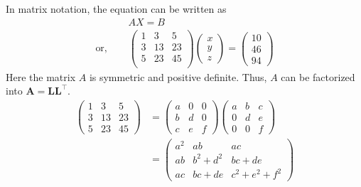 \documentclass[12pt,class=book,crop=false]{standalone}
\begin{document}
\begin{soln}
    In matrix notation, the equation can be written as
    \begin{align*}
                         & AX=B \\
        \text{or, }\quad &
        \begin{pmatrix}
            1 & 3  & 5  \\
            3 & 13 & 23 \\
            5 & 23 & 45 \\
        \end{pmatrix}
        \begin{pmatrix}
            x \\
            y \\
            z
        \end{pmatrix}=
        \begin{pmatrix}
            10 \\
            46 \\
            94
        \end{pmatrix}
    \end{align*}
    Here the matrix $ A $ is symmetric and positive definite. Thus, $ A $ can be factorized into $ \mathbf{A}=\mathbf{L}\mathbf{L}^\top$.
    \begin{align*}
        \begin{pmatrix}
            1 & 3  & 5  \\
            3 & 13 & 23 \\
            5 & 23 & 45
        \end{pmatrix} & =
        \begin{pmatrix}
            a & 0 & 0 \\
            b & d & 0 \\
            c & e & f
        \end{pmatrix}
        \begin{pmatrix}
            a & b & c \\
            0 & d & e \\
            0 & 0 & f
        \end{pmatrix}                                 \\
                                    & = \begin{pmatrix}
            a^2 & ab      & ac          \\
            ab  & b^2+d^2 & bc+de       \\
            ac  & bc+de   & c^2+e^2+f^2
        \end{pmatrix}

\end{align*}
\end{soln}
\end{document}
